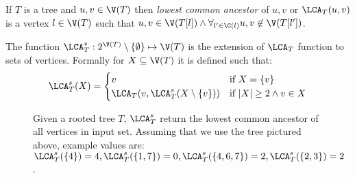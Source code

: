 \begin{defi}
    If $T$ is a tree and $u,v \in \V(T)$ then \emph{lowest common ancestor} of $u, v$ or $\LCA_T(u,v)$ is a vertex $l \in \V(T)$ such that $u,v \in \V(T[l]) \land \forall_{l' \in \C(l)} u,v \not\in \V(T[l'])$.
\end{defi}

\begin{defi}
    The function $\LCA_T^s : 2^{\V(T)} \setminus \{ \emptyset \} \mapsto \V(T)$ is the extension of $\LCA_T$ function to sets of vertices. Formally for $X \subseteq \V(T)$ it is defined such that:
    \[
        \LCA_T^s(X) = \begin{cases}
            v                                      & \text{if } X = \{v\}                \\
            \LCA_T(v, \LCA_T^s(X \setminus \{v\})) & \text{if } |X| \geq 2 \land v \in X \\
        \end{cases}
    \]
\end{defi}

\begin{figure}[h]
    \centering
    \caption{Given a rooted tree $T$, $\LCA_T^s$ return the lowest common ancestor of all vertices in input set. Assuming that we use the tree pictured above, example values are: $\LCA_T^s(\{4\}) = 4, \LCA_T^s(\{1,7\}) = 0, \LCA_T^s(\{4, 6, 7\}) = 2, \LCA_T^s(\{2,3\}) = 2$.}
\end{figure}
